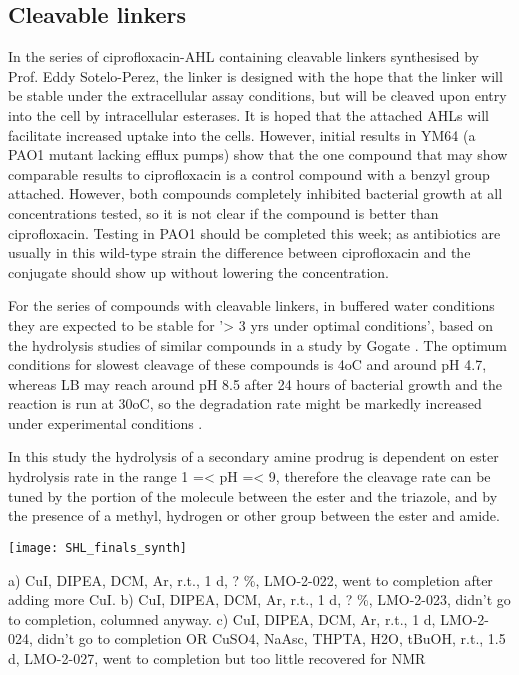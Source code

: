 \subsection{Cleavable linkers}

In the series of ciprofloxacin-AHL containing cleavable linkers synthesised by Prof. Eddy Sotelo-Perez, the linker is designed with the hope that the linker will be stable under the extracellular assay conditions, but will be cleaved upon entry into the cell by intracellular esterases. It is hoped that the attached AHLs will facilitate increased uptake into the cells. However, initial results in YM64 (a PAO1 mutant lacking efflux pumps) show that the one compound that may show comparable results to ciprofloxacin is a control compound with a benzyl group attached. However, both compounds completely inhibited bacterial growth at all concentrations tested, so it is not clear if the compound is better than ciprofloxacin. Testing in PAO1 should be completed this week; as antibiotics are usually in this wild-type strain the difference between ciprofloxacin and the conjugate should show up without lowering the concentration. 

For the series of compounds with cleavable linkers, in buffered water conditions they are expected to be stable  for '> 3 yrs under optimal conditions', based on the hydrolysis studies of similar compounds in a study by Gogate \cite{Gogate1987}. The optimum conditions for slowest cleavage of these compounds is 4oC and around pH 4.7, whereas LB may reach around pH 8.5\cite{Martin} after 24 hours of bacterial growth and the reaction is run at 30oC, so the degradation rate might be markedly increased under experimental conditions \cite{maths}. 

In this study the hydrolysis of a secondary amine prodrug is dependent on ester hydrolysis rate in the range 1 =< pH =< 9, therefore the cleavage rate can be tuned by the portion of the molecule between the ester and the triazole, and by the presence of a methyl, hydrogen or other group between the ester and amide\cite{?}. 

\begin{scheme}[H]
	\begin{center}
		\texttt{[image: SHL\_finals\_synth]}
		\caption{
			a) CuI, DIPEA, DCM, Ar, r.t., 1 d, ? \%, LMO-2-022, went to completion after adding more CuI.
			b) CuI, DIPEA, DCM, Ar, r.t., 1 d, ? \%, LMO-2-023, didn't go to completion, columned anyway.
			c) CuI, DIPEA, DCM, Ar, r.t., 1 d, LMO-2-024, didn't go to completion
			OR CuSO4, NaAsc, THPTA, H2O, tBuOH, r.t., 1.5 d, LMO-2-027, went to completion but too little recovered for NMR\label{sch:}}
	\end{center}
\end{scheme}


